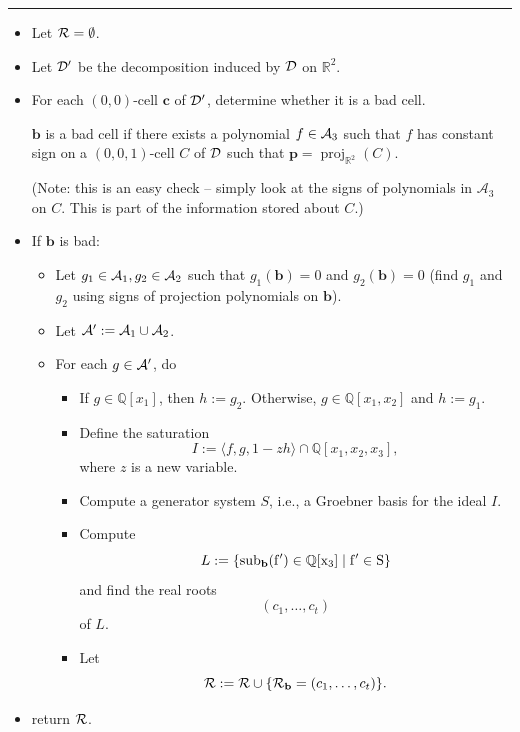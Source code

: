 \documentclass[
]{book}
\theoremstyle{definition}
\theoremstyle{definition}
\theoremstyle{definition}
\theoremstyle{definition}
\theoremstyle{remark}
\begin{document}
\begin{center}\rule{0.5\linewidth}{0.5pt}\end{center}

\begin{itemize}
\item
  Let \({\cal R} = \emptyset\).
\item
  Let \(\cal D'\) be the decomposition induced by \(\cal D\) on \(\mathbb{R}^2\).
\item
  For each \((0,0)\)-cell \(\mathbf{c}\) of \(\cal D'\), determine whether it is a bad cell.

  \(\mathbf{b}\) is a bad cell if there exists a polynomial \(f \in {\cal A}_3\) such that \(f\) has constant sign on a \((0,0,1)\)-cell \(C\) of \(\cal D\) such that \(\mathbf{p} = {\operatorname{proj}_{\mathbb{R}^{2}}}(C)\).

  (Note: this is an easy check -- simply look at the signs of polynomials in \(\mathcal{A}_3\) on \(C\). This is part of the information stored about \(C\).)
\item
  If \(\mathbf{b}\) is bad:

  \begin{itemize}
  \item
    Let \(g_1 \in {\cal A}_1, g_2 \in {\cal A}_2\) such that \(g_1(\mathbf{b}) = 0\) and \(g_2(\mathbf{b}) = 0\) (find \(g_1\) and \(g_2\) using signs of projection polynomials on \(\mathbf{b}\)).
  \item
    Let \({\cal A'} := {\cal A}_1 \cup {\cal A}_2\).
  \item
    For each \(g \in {\cal A'}\), do

    \begin{itemize}
    \item
      If \(g \in \mathbb{Q}[x_1]\), then \(h := g_2\). Otherwise, \(g \in \mathbb{Q}[x_1,x_2]\) and \(h := g_1\).
    \item
      Define the saturation
      \[
      I := \langle f, g, 1 - z h \rangle \cap \mathbb{Q}[x_1,x_2,x_3],
      \]
      where \(z\) is a new variable.
    \item
      Compute a generator system \(S\), i.e., a Groebner basis for the ideal \(I\).
    \item
      Compute
      \[
      L := \{ \rm{sub}_{\mathbf{b}}(f') \in \mathbb{Q}[x_3] \mid f' \in S \}
      \]
      and find the real roots
      \[
      (c_1,\ldots,c_t)
      \]
      of \(L\).
    \item
      Let
      \[
      {\cal R} := {\cal R} \cup \{ {\cal R}_{\mathbf{b}} = (c_1,\ldots,c_t) \}.
      \]
    \end{itemize}
  \end{itemize}
\item
  return \(\cal R\).
\end{itemize}
\end{document}
